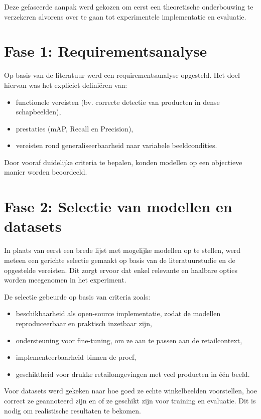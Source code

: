 Deze gefaseerde aanpak werd gekozen om eerst een theoretische onderbouwing te verzekeren alvorens over te gaan tot experimentele implementatie en evaluatie.


\section*{Fase 1: Requirementsanalyse}

Op basis van de literatuur werd een requirementsanalyse opgesteld. Het doel hiervan was het expliciet definiëren van:

\begin{itemize}
    \item functionele vereisten (bv. correcte detectie van producten in dense schapbeelden),
    \item prestaties (mAP, Recall en Precision),
    \item vereisten rond generaliseerbaarheid naar variabele beeldcondities.
\end{itemize}

Door vooraf duidelijke criteria te bepalen, konden modellen op een objectieve manier worden beoordeeld.

\section*{Fase 2: Selectie van modellen en datasets}

In plaats van eerst een brede lijst met mogelijke modellen op te stellen, werd meteen een gerichte selectie gemaakt op basis van de literatuurstudie en de opgestelde vereisten. Dit zorgt ervoor dat enkel relevante en haalbare opties worden meegenomen in het experiment.

De selectie gebeurde op basis van criteria zoals:
\begin{itemize}
\item beschikbaarheid als open-source implementatie, zodat de modellen reproduceerbaar en praktisch inzetbaar zijn,
\item ondersteuning voor fine-tuning, om ze aan te passen aan de retailcontext,
\item implementeerbaarheid binnen de proef,
\item geschiktheid voor drukke retailomgevingen met veel producten in één beeld.
\end{itemize}

Voor datasets werd gekeken naar hoe goed ze echte winkelbeelden voorstellen, hoe correct ze geannoteerd zijn en of ze geschikt zijn voor training en evaluatie. Dit is nodig om realistische resultaten te bekomen.

